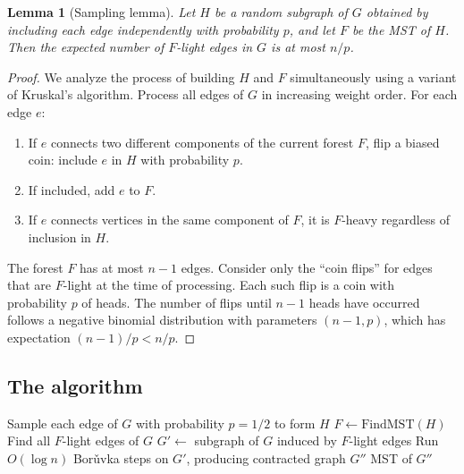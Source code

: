 \documentclass[twoside,12pt]{book}
\theoremstyle{plain}
\newtheorem{lemma}[theorem]{Lemma}
\theoremstyle{definition}
\theoremstyle{remark}
\begin{document}
\begin{lemma}[Sampling lemma]
\label{lem:sampling}
Let $H$ be a random subgraph of $G$ obtained by including each edge independently with probability $p$, and let $F$ be the MST of $H$. Then the expected number of $F$-light edges in $G$ is at most $n/p$.
\end{lemma}

\begin{proof}
We analyze the process of building $H$ and $F$ simultaneously using a variant of Kruskal's algorithm. Process all edges of $G$ in increasing weight order. For each edge $e$:
\begin{enumerate}[nosep]
    \item If $e$ connects two different components of the current forest $F$, flip a biased coin: include $e$ in $H$ with probability $p$.
    \item If included, add $e$ to $F$.
    \item If $e$ connects vertices in the same component of $F$, it is $F$-heavy regardless of inclusion in $H$.
\end{enumerate}

The forest $F$ has at most $n - 1$ edges. Consider only the ``coin flips'' for edges that are $F$-light at the time of processing. Each such flip is a coin with probability $p$ of heads. The number of flips until $n - 1$ heads have occurred follows a negative binomial distribution with parameters $(n-1, p)$, which has expectation $(n-1)/p < n/p$.
\end{proof}

\subsection{The algorithm}

\begin{algorithm}
\caption{Karger--Klein--Tarjan MST Algorithm}
\label{alg:kkt}
\begin{algorithmic}[1]
    \State Sample each edge of $G$ with probability $p = 1/2$ to form $H$
    \State $F \gets \text{FindMST}(H)$ 
    \State Find all $F$-light edges of $G$ 
    \State $G' \gets$ subgraph of $G$ induced by $F$-light edges
    \State Run $O(\log n)$ Bor\v{u}vka steps on $G'$, producing contracted graph $G''$
    \State \Return MST of $G''$ 
\EndFunction
\end{algorithmic}
\end{algorithm}
\end{document}
